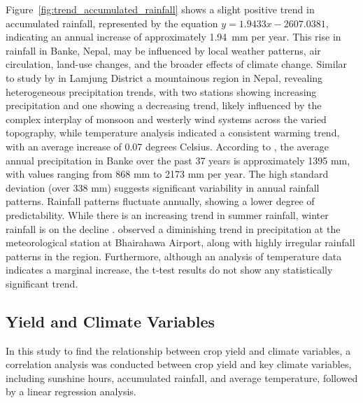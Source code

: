 Figure~\ref{fig:trend_accumulated_rainfall} shows a slight positive trend in accumulated rainfall, represented by the equation $y=1.9433x - 2607.0381$, indicating an annual increase of approximately 1.94~mm per year. This rise in rainfall in Banke, Nepal, may be influenced by local weather patterns, air circulation, land-use changes, and the broader effects of climate change. Similar to study by \citet{poudelRelationshipsClimateVariability2016} in Lamjung District a mountainous region in Nepal, revealing heterogeneous precipitation trends, with two stations showing increasing precipitation and one showing a decreasing trend, likely influenced by the complex interplay of monsoon and westerly wind systems across the varied topography, while temperature analysis indicated a consistent warming trend, with an average increase of 0.07 degrees Celsius.
According to \citet{regmiCropYieldResponse2019}, the average annual precipitation in Banke over the past 37 years is approximately 1395 mm, with values ranging from 868 mm to 2173 mm per year. The high standard deviation (over 338 mm) suggests significant variability in annual rainfall patterns. 
Rainfall patterns fluctuate annually, showing a lower degree of predictability. While there is an increasing trend in summer rainfall, winter rainfall is on the decline \citep{maharjanEffectClimateVariables2013}.
\citet{manandharAdaptingCroppingSystems2011} observed a diminishing trend in precipitation at the meteorological station at Bhairahawa Airport, along with highly irregular rainfall patterns in the region. Furthermore, although an analysis of temperature data indicates a marginal increase, the t-test results do not show any statistically significant trend.

\subsection{Yield and Climate Variables}
In this study to find the relationship between crop yield and climate variables, a correlation analysis was conducted between crop yield and key climate variables, including sunshine hours, accumulated rainfall, and average temperature, followed by a linear regression analysis.

\begin{table}[htbp]
    \centering
    \caption{Correlation Table between Yield and Climate Variables}
\end{table}

